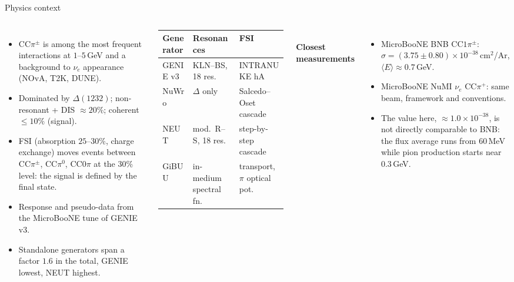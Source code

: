 \documentclass[aspectratio=169,10pt]{beamer}
\begin{document}
\begin{frame}{Physics context}
  \begin{columns}[T]
  \begin{itemize}\small\setlength\itemsep{3pt}
    \item CC$\pi^\pm$ is among the most frequent interactions at $1$--$5$\,GeV and a background to
      $\nu_e$ appearance (NOvA, T2K, DUNE).
    \item Dominated by $\Delta(1232)$; non-resonant + DIS $\approx20\%$; coherent $\le10\%$ (signal).
    \item FSI (absorption $25$--$30\%$, charge exchange) moves events between CC$\pi^\pm$, CC$\pi^0$,
      CC$0\pi$ at the $30\%$ level: the signal is defined by the final state.
    \item Response and pseudo-data from the MicroBooNE tune of GENIE v3.
    \item Standalone generators span a factor $1.6$ in the total, GENIE lowest, NEUT highest.
  \end{itemize}
  \scriptsize\setlength{\tabcolsep}{2pt}
  \begin{tabular}{@{}p{1.3cm}p{2.1cm}p{2.9cm}@{}}
    \toprule
    Generator & Resonances & FSI \\\midrule
    GENIE v3 & KLN--BS, 18 res. & INTRANUKE hA \\
    NuWro & $\Delta$ only & Salcedo--Oset cascade \\
    NEUT & mod.\ R--S, 18 res. & step-by-step cascade \\
    GiBUU & in-medium spectral fn. & transport, $\pi$ optical pot. \\
    \bottomrule
  \end{tabular}\\[3mm]
  \textbf{Closest measurements}
  \begin{itemize}\scriptsize
    \item MicroBooNE BNB CC$1\pi^\pm$: $\sigma=(3.75\pm0.80)\times10^{-38}$\,cm$^2$/Ar, $\langle E\rangle\approx0.7$\,GeV.
    \item MicroBooNE NuMI $\nu_e$ CC$\pi^+$: same beam, framework and conventions.
    \item The value here, $\approx1.0\times10^{-38}$, is not directly comparable to BNB: the flux
      average runs from $60$\,MeV while pion production starts near $0.3$\,GeV.
  \end{itemize}
  \end{columns}
\end{frame}
\end{document}
